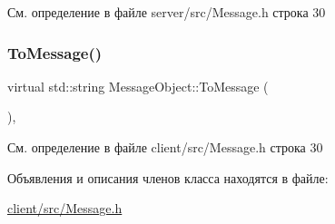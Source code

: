 См. определение в файле server/src/\+Message.\+h строка 30

\mbox{\label{class_message_object_ae123b0190cfd5623d0846593bf36de72}} 
\subsubsection{\texorpdfstring{ToMessage()}{ToMessage()}\hspace{0.1cm}{\footnotesize\ttfamily [2/2]}}
{\footnotesize\ttfamily virtual std\+::string Message\+Object\+::\+To\+Message (\begin{DoxyParamCaption}{ }\end{DoxyParamCaption})\hspace{0.3cm}{\ttfamily [inline]}, {\ttfamily [virtual]}}



См. определение в файле client/src/\+Message.\+h строка 30



Объявления и описания членов класса находятся в файле\+:\begin{DoxyCompactItemize}
\item 
\mbox{\hyperlink{client_2src_2_message_8h}{client/src/\+Message.\+h}}\end{DoxyCompactItemize}
